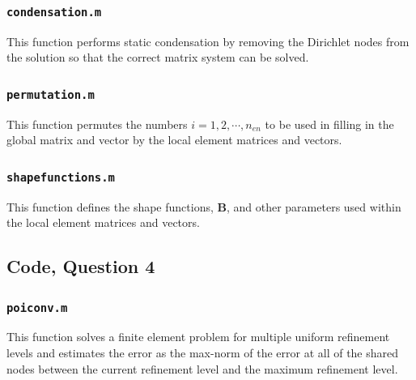 \documentclass[10pt]{article}
\begin{document}
\subsubsection{\tt condensation.m}
This function performs static condensation by removing the Dirichlet nodes from the solution so that the correct matrix system can be solved.


\subsubsection{\tt permutation.m}
This function permutes the numbers \(i=1, 2, \cdots, n_{en}\) to be used in filling in the global matrix and vector by the local element matrices and vectors.


\subsubsection{\tt shapefunctions.m}
This function defines the shape functions, \textbf{B}, and other parameters used within the local element matrices and vectors.



\subsection{Code, Question 4}

\subsubsection{\tt poiconv.m}
This function solves a finite element problem for multiple uniform refinement levels and estimates the error as the max-norm of the error at all of the shared nodes between the current refinement level and the maximum refinement level.

\end{document}
